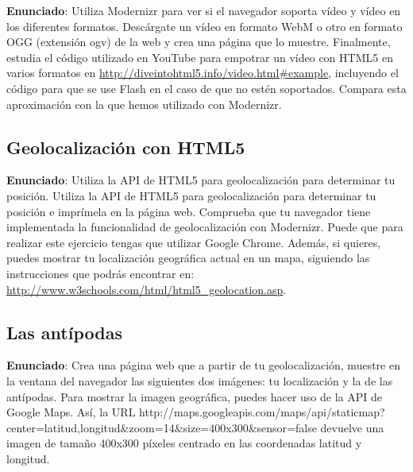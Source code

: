\textbf{Enunciado}: Utiliza Modernizr para ver si el navegador soporta vídeo y vídeo en los diferentes formatos. Descárgate un vídeo en formato WebM o otro en formato OGG (extensión ogv) de la web y crea una página que lo muestre. Finalmente, estudia el código utilizado en YouTube para empotrar un vídeo con HTML5 en varios formatos en \url{http://diveintohtml5.info/video.html#example}, incluyendo el código para que se use Flash en el caso de que no estén soportados. Compara esta aproximación con la que hemos utilizado con Modernizr.

\subsection{Geolocalización con HTML5}
\label{subsec:geolocalizacion}

\textbf{Enunciado}: Utiliza la API de HTML5 para geolocalización para determinar tu posición. Utiliza la API de HTML5 para geolocalización para determinar tu posición e imprímela en la página web. Comprueba que tu navegador tiene implementada la funcionalidad de geolocalización con Modernizr. Puede que para realizar este ejercicio tengas que utilizar Google Chrome. Además, si quieres, puedes mostrar tu localización geográfica actual en un mapa, siguiendo las instrucciones que podrás encontrar en: \url{http://www.w3schools.com/html/html5_geolocation.asp}.


\subsection{Las antípodas}
\label{subsec:antipodas}

\textbf{Enunciado}: Crea una página web que a partir de tu geolocalización, muestre en la ventana del navegador las siguientes dos imágenes: tu localización y la de las antípodas. Para mostrar la imagen geográfica, puedes hacer uso de la API de Google Maps. Así, la URL http://maps.googleapis.com/maps/api/staticmap?center=latitud,longitud\&zoom=14\&size=400x300\&sensor=false devuelve una imagen de tamaño 400x300 píxeles centrado en las coordenadas latitud y longitud.


